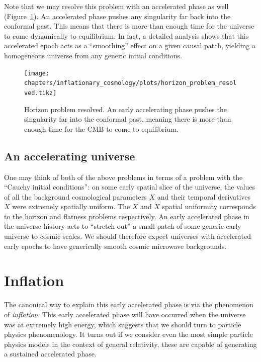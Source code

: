Note that we may resolve this problem with an accelerated phase as well (Figure~\ref{fig:cos:horizon_problem_resolved}). An accelerated phase pushes any singularity far back into the conformal past. This means that there is more than enough time for the universe to come dynamically to equilibrium. In fact, a detailed analysis shows that this accelerated epoch acts as a ``smoothing'' effect on a given causal patch, yielding a homogeneous universe from any generic initial conditions.


\begin{figure}[tp]
  \centering
  \texttt{[image: chapters/inflationary\_cosmology/plots/horizon\_problem\_resolved.tikz]}
  \caption{Horizon problem resolved. An early accelerating phase pushes the singularity far into the conformal past, meaning there is more than enough time for the CMB to come to equilibrium.}\label{fig:cos:horizon_problem_resolved}
\end{figure}

\subsection{An accelerating universe}
One may think of both of the above problems in terms of a problem with the ``Cauchy initial conditions'': on some early spatial slice of the universe, the values of all the background cosmological parameters \(X\) and their temporal derivatives \(\dot{X}\) were extremely spatially uniform. The \(X\) and \(\dot{X}\) spatial uniformity corresponds to the horizon and flatness problems respectively. An early accelerated phase in the universe history acts to ``stretch out'' a small patch of some generic early universe to cosmic scales. We should therefore expect universes with accelerated early epochs to have generically smooth cosmic microwave backgrounds.

\section{Inflation}
The canonical way to explain this early accelerated phase is via the phenomenon of {\em inflation}. This early accelerated phase will have occurred when the universe was at extremely high energy, which suggests that we should turn to particle physics phenomenology.
It turns out if we consider even the most simple particle physics models in the context of general relativity, these are capable of generating a sustained accelerated phase.

